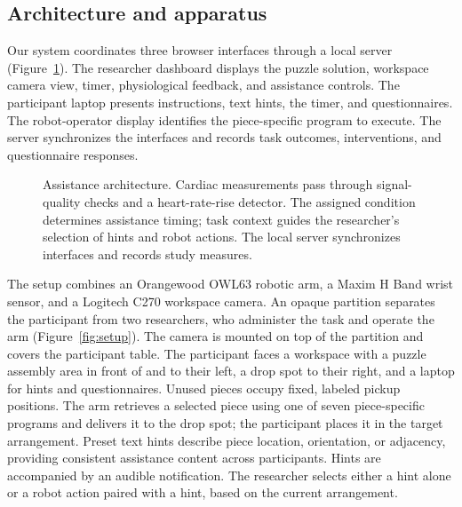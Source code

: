 \documentclass[sigconf,anonymous]{aamas}
\begin{document}
\subsection{Architecture and apparatus}

Our system coordinates three browser interfaces through a local server (Figure~\ref{fig:architecture}). The researcher dashboard displays the puzzle solution, workspace camera view, timer, physiological feedback, and assistance controls. The participant laptop presents instructions, text hints, the timer, and questionnaires. The robot-operator display identifies the piece-specific program to execute. The server synchronizes the interfaces and records task outcomes, interventions, and questionnaire responses.

\begin{figure}[t]
\centering
\begingroup
\renewcommand{\footnotesize}{\fontsize{10}{11}\selectfont}
\renewcommand{\scriptsize}{\fontsize{8.5}{9.5}\selectfont}
\renewcommand{\small}{\fontsize{10}{11}\selectfont}
\resizebox{.86\textwidth}{!}{}
\endgroup
\caption{Assistance architecture. Cardiac measurements pass through signal-quality checks and a heart-rate-rise detector. The assigned condition determines assistance timing; task context guides the researcher’s selection of hints and robot actions. The local server synchronizes interfaces and records study measures.}
\label{fig:architecture}
\end{figure}

The setup combines an Orangewood OWL63 robotic arm, a Maxim H Band wrist sensor, and a Logitech C270 workspace camera. An opaque partition separates the participant from two researchers, who administer the task and operate the arm (Figure~\ref{fig:setup}). The camera is mounted on top of the partition and covers the participant table. The participant faces a workspace with a puzzle assembly area in front of and to their left, a drop spot to their right, and a laptop for hints and questionnaires. Unused pieces occupy fixed, labeled pickup positions. The arm retrieves a selected piece using one of seven piece-specific programs and delivers it to the drop spot; the participant places it in the target arrangement. Preset text hints describe piece location, orientation, or adjacency, providing consistent assistance content across participants. Hints are accompanied by an audible notification. The researcher selects either a hint alone or a robot action paired with a hint, based on the current arrangement.
\end{document}
